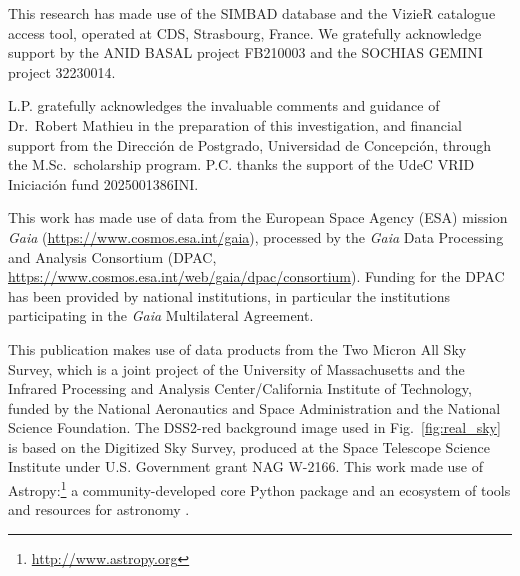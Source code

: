 \documentclass{aa}
\begin{document}
\begin{acknowledgements}
This research has made use of the SIMBAD database and the VizieR catalogue access tool, operated at CDS, Strasbourg, France. We gratefully acknowledge support by the ANID BASAL project FB210003 and the SOCHIAS GEMINI project 32230014.

L.P. gratefully acknowledges the invaluable comments and guidance of Dr.\ Robert Mathieu in the preparation of this investigation, and financial support from the Dirección de Postgrado, Universidad de Concepción, through the M.Sc.\ scholarship program. P.C. thanks the support of the UdeC VRID Iniciación fund 2025001386INI\@.

This work has made use of data from the European Space Agency (ESA) mission \textit{Gaia} (\url{https://www.cosmos.esa.int/gaia}), processed by the \textit{Gaia} Data Processing and Analysis Consortium (DPAC, \url{https://www.cosmos.esa.int/web/gaia/dpac/consortium}). Funding for the DPAC has been provided by national institutions, in particular the institutions participating in the \textit{Gaia} Multilateral Agreement. 

This publication makes use of data products from the Two Micron All Sky Survey, which is a joint project of the University of Massachusetts and the Infrared Processing and Analysis Center/California Institute of Technology, funded by the National Aeronautics and Space Administration and the National Science Foundation. The DSS2-red background image used in Fig.~\ref{fig:real_sky} is based on the Digitized Sky Survey, produced at the Space Telescope Science Institute under U.S. Government grant NAG W-2166. This work made use of Astropy:\footnote{\url{http://www.astropy.org}} a community-developed core Python package and an ecosystem of tools and resources for astronomy \citep{astropy:2013, astropy:2018, astropy:2022}.
\end{acknowledgements}


 
\end{document}

